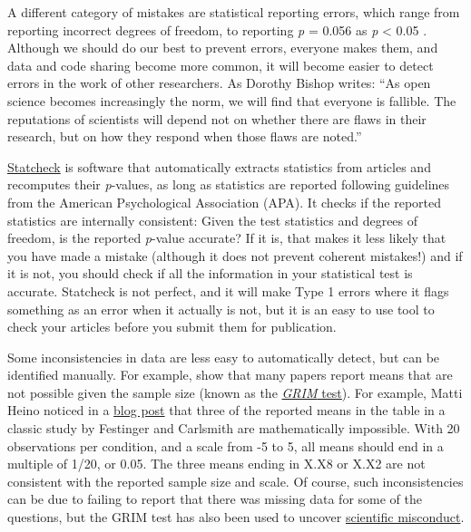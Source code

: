 \documentclass[
  oneside]{book}
\begin{document}
A different category of mistakes are statistical reporting errors, which range from reporting incorrect degrees of freedom, to reporting \emph{p} = 0.056 as \emph{p} \textless{} 0.05 \citep{nuijten_prevalence_2015}. Although we should do our best to prevent errors, everyone makes them, and data and code sharing become more common, it will become easier to detect errors in the work of other researchers. As Dorothy Bishop \citeyearpar{bishop_fallibility_2018} writes: ``As open science becomes increasingly the norm, we will find that everyone is fallible. The reputations of scientists will depend not on whether there are flaws in their research, but on how they respond when those flaws are noted.''

\href{http://statcheck.io/}{Statcheck} is software that automatically extracts statistics from articles and recomputes their \emph{p}-values, as long as statistics are reported following guidelines from the American Psychological Association (APA). It checks if the reported statistics are internally consistent: Given the test statistics and degrees of freedom, is the reported \emph{p}-value accurate? If it is, that makes it less likely that you have made a mistake (although it does not prevent coherent mistakes!) and if it is not, you should check if all the information in your statistical test is accurate. Statcheck is not perfect, and it will make Type 1 errors where it flags something as an error when it actually is not, but it is an easy to use tool to check your articles before you submit them for publication.

Some inconsistencies in data are less easy to automatically detect, but can be identified manually. For example, \citet{brown_grim_2017} show that many papers report means that are not possible given the sample size (known as the \href{http://nickbrown.fr/GRIM}{\emph{GRIM} test}). For example, Matti Heino noticed in a \href{https://mattiheino.com/2016/11/13/legacy-of-psychology/}{blog post} that three of the reported means in the table in a classic study by Festinger and Carlsmith are mathematically impossible. With 20 observations per condition, and a scale from -5 to 5, all means should end in a multiple of 1/20, or 0.05. The three means ending in X.X8 or X.X2 are not consistent with the reported sample size and scale. Of course, such inconsistencies can be due to failing to report that there was missing data for some of the questions, but the GRIM test has also been used to uncover \href{https://en.wikipedia.org/wiki/GRIM_test}{scientific misconduct}.
\end{document}

